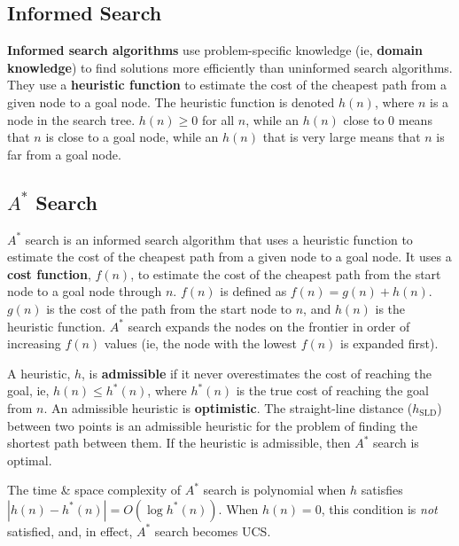 
\subsection{Informed Search}
\label{sub_sec:informed_search}

\begin{definition}
    \textbf{Informed search algorithms} use problem-specific knowledge (ie, \textbf{domain knowledge}) to find solutions more efficiently than uninformed search algorithms. They use a \textbf{heuristic function} to estimate the cost of the cheapest path from a given node to a goal node. The heuristic function is denoted $h(n)$, where $n$ is a node in the search tree. $h(n) \ge 0$ for all $n$, while an $h(n)$ close to $0$ means that $n$ is close to a goal node, while an $h(n)$ that is very large means that $n$ is far from a goal node.
\end{definition}

\subsection{$A^{*}$ Search}
\label{sub_sec:a_star_search}

$A^{*}$ search is an informed search algorithm that uses a heuristic function to estimate the cost of the cheapest path from a given node to a goal node. It uses a \textbf{cost function}, $f(n)$, to estimate the cost of the cheapest path from the start node to a goal node through $n$. $f(n)$ is defined as $f(n) = g(n) + h(n)$. $g(n)$ is the cost of the path from the start node to $n$, and $h(n)$ is the heuristic function. $A^{*}$ search expands the nodes on the frontier in order of increasing $f(n)$ values (ie, the node with the lowest $f(n)$ is expanded first).

\begin{definition}
    A heuristic, $h$, is \textbf{admissible} if it never overestimates the cost of reaching the goal, ie, $h(n) \le h^{*}(n)$, where $h^{*}(n)$ is the true cost of reaching the goal from $n$. An admissible heuristic is \textbf{optimistic}. The straight-line distance ($h_{\text{SLD}}$) between two points is an admissible heuristic for the problem of finding the shortest path between them. If the heuristic is admissible, then $A^{*}$ search is optimal.
\end{definition}

The time \& space complexity of $A^{*}$ search is polynomial when $h$ satisfies $| h(n) - h^{*}(n) | = O(\log h^{*}(n))$. When $h(n) = 0$, this condition is \emph{not} satisfied, and, in effect, $A^{*}$ search becomes UCS\@.

